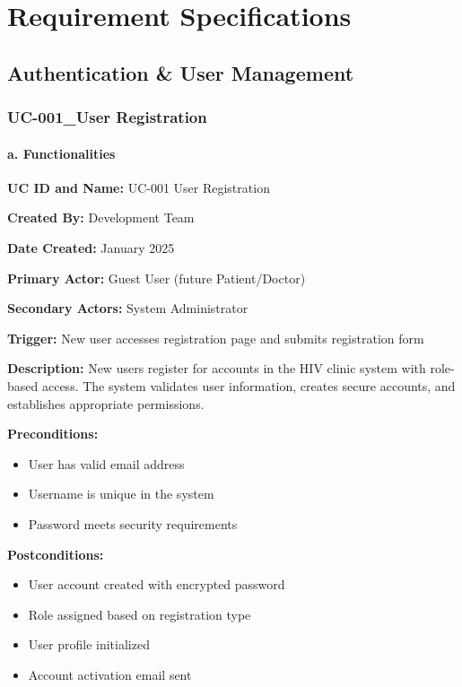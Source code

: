 \documentclass[12pt,a4paper]{article}
\begin{document}
\section{Requirement Specifications}

\subsection{Authentication \& User Management}

\subsubsection{UC-001\_User Registration}

\paragraph{a. Functionalities}

\textbf{UC ID and Name:} UC-001 User Registration

\textbf{Created By:} Development Team

\textbf{Date Created:} January 2025

\textbf{Primary Actor:} Guest User (future Patient/Doctor)

\textbf{Secondary Actors:} System Administrator

\textbf{Trigger:} New user accesses registration page and submits registration form

\textbf{Description:} New users register for accounts in the HIV clinic system with role-based access. The system validates user information, creates secure accounts, and establishes appropriate permissions.

\textbf{Preconditions:}
\begin{itemize}
    \item User has valid email address
    \item Username is unique in the system
    \item Password meets security requirements
\end{itemize}

\textbf{Postconditions:}
\begin{itemize}
    \item User account created with encrypted password
    \item Role assigned based on registration type
    \item User profile initialized
    \item Account activation email sent
\end{itemize}
\end{document}
